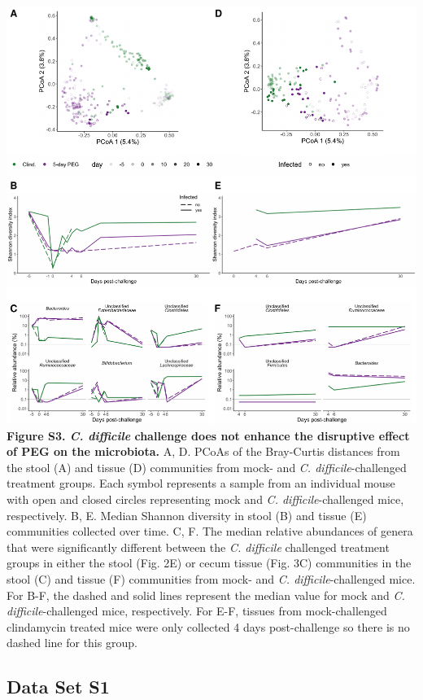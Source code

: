 \documentclass[
  11pt,
]{article}
\begin{document}
\includegraphics{figure_S3.pdf} \textbf{Figure S3. \emph{C. difficile}
challenge does not enhance the disruptive effect of PEG on the
microbiota.} A, D. PCoAs of the Bray-Curtis distances from the stool (A)
and tissue (D) communities from mock- and \emph{C. difficile}-challenged
treatment groups. Each symbol represents a sample from an individual
mouse with open and closed circles representing mock and \emph{C.
difficile}-challenged mice, respectively. B, E. Median Shannon diversity
in stool (B) and tissue (E) communities collected over time. C, F. The
median relative abundances of genera that were significantly different
between the \emph{C. difficile} challenged treatment groups in either
the stool (Fig. 2E) or cecum tissue (Fig. 3C) communities in the stool
(C) and tissue (F) communities from mock- and \emph{C.
difficile}-challenged mice. For B-F, the dashed and solid lines
represent the median value for mock and \emph{C. difficile}-challenged
mice, respectively. For E-F, tissues from mock-challenged clindamycin
treated mice were only collected 4 days post-challenge so there is no
dashed line for this group. \newpage

\hypertarget{data-set-s1}{%
\subsection{Data Set S1}\label{data-set-s1}}
\end{document}
